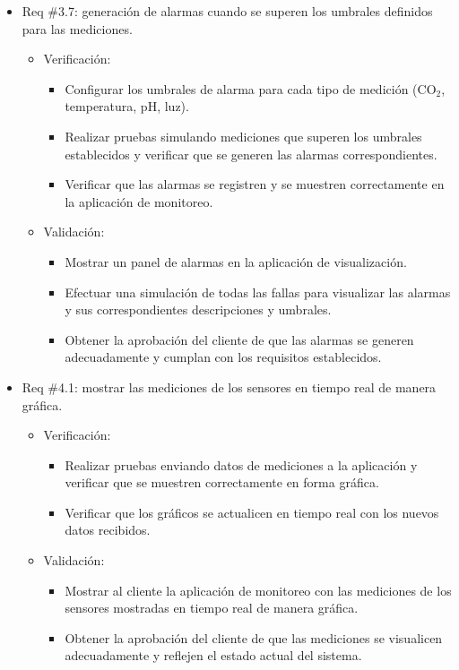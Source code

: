 \documentclass[
11pt, %
]{charter}
\begin{document}
\begin{itemize} 
\item Req \#3.7: generación de alarmas cuando se superen los umbrales definidos para las mediciones.

\begin{itemize}
	\item Verificación: 
            \begin{itemize}
            \item Configurar los umbrales de alarma para cada tipo de medición (CO$_2$, temperatura, pH, luz).
            \item Realizar pruebas simulando mediciones que superen los umbrales establecidos y verificar que se generen las alarmas correspondientes.
            \item Verificar que las alarmas se registren y se muestren correctamente en la aplicación de monitoreo.
            \end{itemize}
	\item Validación: 
            \begin{itemize}
            \item Mostrar un panel de alarmas en la aplicación de visualización.
            \item Efectuar una simulación de todas las fallas para visualizar las alarmas y sus correspondientes descripciones y umbrales.
            \item Obtener la aprobación del cliente de que las alarmas se generen adecuadamente y cumplan con los requisitos establecidos.
            \end{itemize}
\end{itemize}
\end{itemize}

\begin{itemize} 
\item Req \#4.1: mostrar las mediciones de los sensores en tiempo real de manera gráfica.

\begin{itemize}
	\item Verificación: 
            \begin{itemize}
            \item Realizar pruebas enviando datos de mediciones a la aplicación y verificar que se muestren correctamente en forma gráfica.
            \item Verificar que los gráficos se actualicen en tiempo real con los nuevos datos recibidos.
            \end{itemize}
	\item Validación: 
            \begin{itemize}
            \item Mostrar al cliente la aplicación de monitoreo con las mediciones de los sensores mostradas en tiempo real de manera gráfica.
            \item Obtener la aprobación del cliente de que las mediciones se visualicen adecuadamente y reflejen el estado actual del sistema.
            \end{itemize}
\end{itemize}
\end{itemize}
\end{document}
